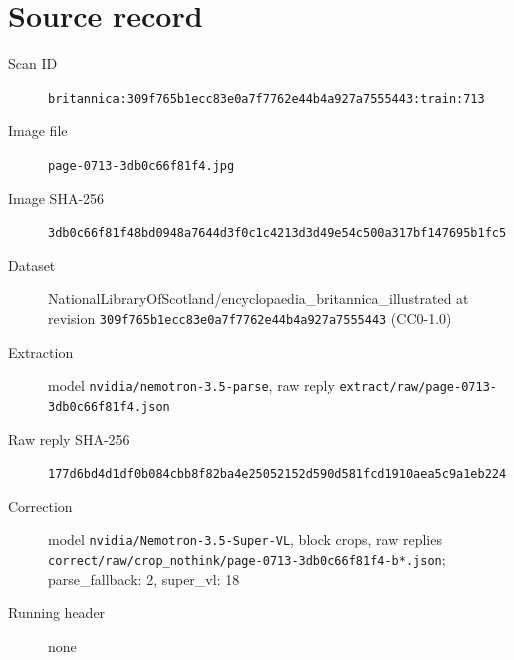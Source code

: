 \documentclass{article}
\begin{document}
\section*{Source record}
\begin{description}
\item[Scan ID] \texttt{britannica:309f765b1ecc83e0a7f7762e44b4a927a7555443:train:713}
\item[Image file] \texttt{page-0713-3db0c66f81f4.jpg}
\item[Image SHA-256] \texttt{3db0c66f81f48bd0948a7644d3f0c1c4213d3d49e54c500a317bf147695b1fc5}
\item[Dataset] NationalLibraryOfScotland/encyclopaedia\_britannica\_illustrated at revision \texttt{309f765b1ecc83e0a7f7762e44b4a927a7555443} (CC0-1.0)
\item[Extraction] model \texttt{nvidia/nemotron-3.5-parse}, raw reply \texttt{extract/raw/page-0713-3db0c66f81f4.json}
\item[Raw reply SHA-256] \texttt{177d6bd4d1df0b084cbb8f82ba4e25052152d590d581fcd1910aea5c9a1eb224}
\item[Correction] model \texttt{nvidia/Nemotron-3.5-Super-VL}, block crops, raw replies \texttt{correct/raw/crop\_nothink/page-0713-3db0c66f81f4-b*.json}; parse\_fallback: 2, super\_vl: 18
\item[Running header] none
\end{description}
\end{document}
